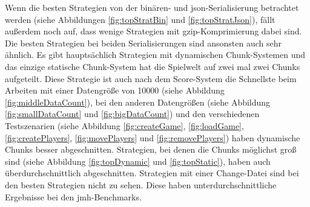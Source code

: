 Wenn die besten Strategien von der binären- und \ac{json}-Serialisierung betrachtet werden (siehe Abbildungen \ref{fig:topStratBin} und \ref{fig:topStratJson}), fällt außerdem noch auf, dass wenige Strategien mit \ac{gzip}-Komprimierung dabei sind. Die besten Strategien bei beiden Serialisierungen sind ansonsten auch sehr ähnlich. Es gibt hauptsächlich Strategien mit dynamischen Chunk-Systemen und das einzige statische Chunk-System hat die Spielwelt auf zwei mal zwei Chunks aufgeteilt. Diese Strategie ist auch nach dem Score-System die Schnellste beim Arbeiten mit einer Datengröße von 10000 (siehe Abbildung \ref{fig:middleDataCount}), bei den anderen Datengrößen (siehe Abbildung \ref{fig:smallDataCount} und \ref{fig:bigDataCount}) und den verschiedenen Testszenarien (siehe Abbildung \ref{fig:createGame}, \ref{fig:loadGame}, \ref{fig:createPlayers}, \ref{fig:movePlayers} und \ref{fig:removePlayers}) haben dynamische Chunks besser abgeschnitten. Strategien, bei denen die Chunks möglichst groß sind (siehe Abbildung \ref{fig:topDynamic} und \ref{fig:topStatic}), haben auch überdurchschnittlich abgeschnitten. Strategien mit einer Change-Datei sind bei den besten Strategien nicht zu sehen. Diese haben unterdurchschnittliche Ergebnisse bei den \ac{jmh}-Benchmarks.

